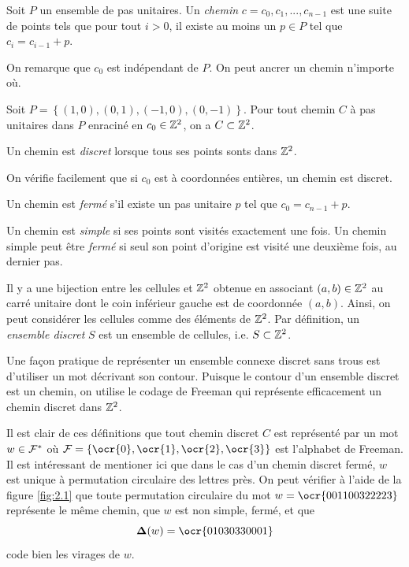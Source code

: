\begin{definition}
Soit $P$ un ensemble de pas unitaires. Un \emph{chemin} $c=c_0,c_1,...,c_{n-1}$ est une suite de points tels que pour tout $i>0$, il existe au moins un $p\in P$ tel que $c_{i} = c_{i-1} + p$.
\end{definition}

On remarque que $c_0$ est indépendant de $P$. On peut ancrer un chemin n'importe où.

\begin{proposition}
Soit $P=\left\lbrace (1,0),(0,1),(-1,0),(0,-1) \right\rbrace$. Pour tout chemin $C$ à pas unitaires dans $P$ enraciné en $c_0 \in \mathbb{Z}^2$, on a $C \subset \mathbb{Z}^2$.
\end{proposition}
 
\begin{definition}
Un chemin est \emph{discret} lorsque tous ses points sonts dans $\mathbb{Z}^2$.
\end{definition}

On vérifie facilement que si $c_0$ est à coordonnées entières, un chemin est discret.
 
\begin{definition}
Un chemin est \emph{fermé} s'il existe un pas unitaire $p$ tel que $c_0 = c_{n-1}+p$.
\end{definition}

\begin{definition}
Un chemin est \emph{simple} si ses points sont visités exactement une fois. Un chemin simple peut être \emph{fermé} si seul son point d'origine est visité une deuxième fois, au dernier pas.
\end{definition}

Il y a une bijection entre les cellules et $\mathbb{Z}^2$ obtenue en associant $(a,b)\in \mathbb{Z}^2$ au carré unitaire dont le coin inférieur gauche est de coordonnée $(a,b)$. Ainsi, on peut considérer les cellules comme des éléments de $\mathbb{Z}^2$. Par définition, un \emph{ensemble discret} $S$ est un ensemble de cellules, i.e. $S\subset \mathbb{Z}^2$.

Une façon pratique de représenter un ensemble connexe discret sans trous est d'utiliser un mot décrivant son contour. Puisque le contour d'un ensemble discret est un chemin, on utilise le codage de Freeman qui représente efficacement un chemin discret dans $\mathbb{Z}^2$.

\newcommand{\firstdifference}{\ensuremath{\mathbf{\Delta}}}

Il est clair de ces définitions que tout chemin discret $C$ est représenté par un mot $w\in \mathcal{F}^*$ où $\F=\{\ocr{0},\ocr{1},\ocr{2},\ocr{3}\}$ est l'alphabet de Freeman. Il est intéressant de mentioner ici que dans le cas d'un chemin discret fermé, $w$ est unique à permutation circulaire des lettres près. On peut vérifier à l'aide de la figure \ref{fig:2.1} que toute permutation circulaire du mot $w=\ocr{001100322223}$ représente le même chemin, que $w$ est non simple, fermé, et que $$\firstdifference(w)=\ocr{01030330001}$$
code bien les virages de $w$.

